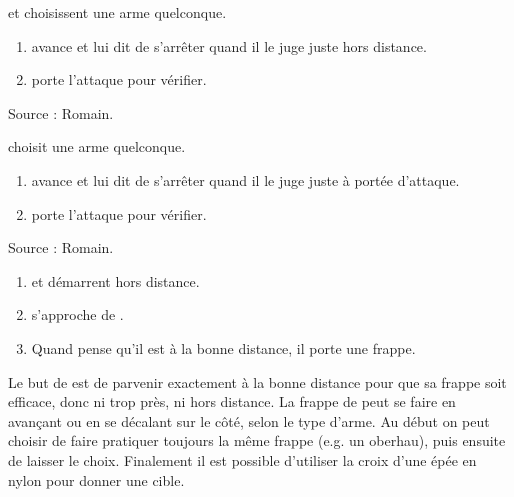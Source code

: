 \begin{exercice}
\A et \D choisissent une arme quelconque.

\begin{enumerate}
	\item \A avance et \D lui dit de s'arrêter quand il le juge juste hors distance.
	
	\item \A porte l'attaque pour vérifier.
\end{enumerate}

Source : Romain.

\end{exercice}


\begin{exercice}
\A choisit une arme quelconque.

\begin{enumerate}
	\item \D avance et \A lui dit de s'arrêter quand il le juge juste à portée d'attaque.
	
	\item \A porte l'attaque pour vérifier.
\end{enumerate}

Source : Romain.

\end{exercice}


\begin{exercice}
\label{ex:frappe-dist:approche-frappe}

\begin{enumerate}
	\item \A et \D démarrent hors distance.
	\item \D s'approche de \A.
	\item Quand \A pense qu'il est à la bonne distance, il porte une frappe.
\end{enumerate}

Le but de \A est de parvenir exactement à la bonne distance pour que sa frappe soit efficace, donc ni trop près, ni hors distance.
La frappe de \A peut se faire en avançant ou en se décalant sur le côté, selon le type d'arme.
Au début on peut choisir de faire pratiquer toujours la même frappe (e.g.
un oberhau), puis ensuite de laisser le choix.
Finalement il est possible d'utiliser la croix d'une épée en nylon pour donner une cible.

\end{exercice}


